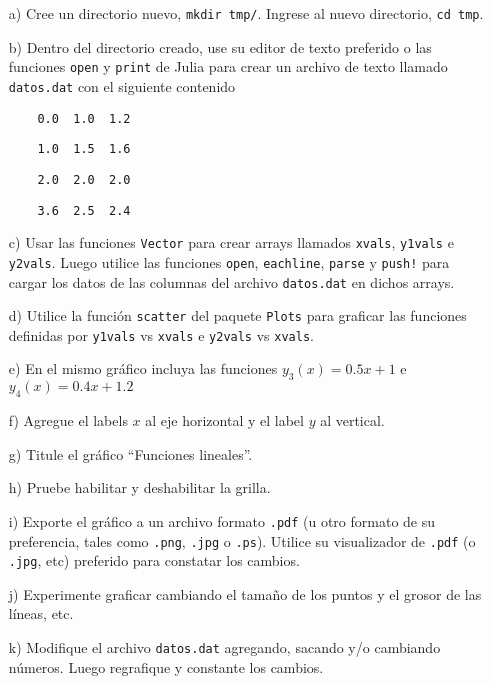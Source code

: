 \documentclass[a4paper]{article}
\newcounter{problema}
\newcommand{\prob}[1]{\vspace{0.33cm}\stepcounter{problema}
                 \noindent{\bf Ejercicio \arabic{problema}:}{\it #1}}
\begin{document}
\prob{} 
\begin{itemize}
\item[a)] 
Cree un directorio nuevo, \verb+mkdir tmp/+. 
Ingrese al nuevo directorio, \verb+cd tmp+.

\item[b)] 
Dentro del directorio creado, use su editor de texto preferido o las funciones \verb+open+ y \verb+print+ de Julia para crear un archivo de texto llamado \verb+datos.dat+ con el siguiente contenido

\verb+    0.0  1.0  1.2+

\verb+    1.0  1.5  1.6+

\verb+    2.0  2.0  2.0+

\verb+    3.6  2.5  2.4+

\item[c)] 
Usar las funciones \verb+Vector+ para crear arrays llamados \verb+xvals+, \verb+y1vals+ e \verb+y2vals+. Luego utilice las funciones \verb+open+, \verb+eachline+, \verb+parse+ y \verb+push!+ para cargar los datos de las columnas del archivo \verb+datos.dat+ en dichos arrays.

\item[d)] 
Utilice la funci\'on \verb+scatter+ del paquete \verb+Plots+ para graficar las funciones definidas por \verb+y1vals+ vs \verb+xvals+ e \verb+y2vals+ vs \verb+xvals+.

\item[e)] 
En el mismo gr\'afico incluya las funciones $y_3(x) = 0.5x + 1$ e $y_4(x) = 0.4x + 1.2$

\item[f)] 
Agregue el labels $x$ al eje horizontal y el label $y$ al vertical.

\item[g)] 
Titule el gr\'afico ``Funciones lineales''.

\item[h)] 
Pruebe habilitar y deshabilitar la grilla.

\item[i)] 
Exporte el gr\'afico a un archivo formato \verb+.pdf+ (u otro formato de su preferencia, tales como \verb+.png+, \verb+.jpg+ o \verb+.ps+). 
Utilice su visualizador de \verb+.pdf+ (o \verb+.jpg+, etc) preferido para constatar los cambios.

\item[j)] 
Experimente graficar cambiando el tama\~no de los puntos y el grosor de las l\'ineas, etc.

\item[k)] 
Modifique el archivo \verb+datos.dat+ agregando, sacando y/o cambiando n\'umeros. 
Luego regrafique y constante los cambios.
\end{itemize}
\end{document}
